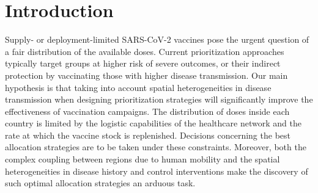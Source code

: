 

\section{Introduction}
Supply- or deployment-limited SARS-CoV-2 vaccines\cite{Khamsi:IfCoronavirusVaccine:2020} pose the urgent question of a fair distribution of the available doses\cite{NationalAcademiesofSciencesEngineeringandMedicine:FrameworkEquitableAllocation:2020}. Current prioritization approaches typically target groups at higher risk of severe outcomes\cite{Spassiani:VaccinationCriteriaBased:2020, Matrajt:VaccineOptimizationCOVID19:2020a}, or their indirect protection by vaccinating those with higher disease transmission\cite{Spassiani:VaccinationCriteriaBased:2020,Gallagher:IndirectBenefitsAre:2021,Tuite:AlternativeDoseAllocation:2021}. Our main hypothesis is that taking into account spatial heterogeneities in disease transmission when designing prioritization strategies will significantly improve the effectiveness of vaccination campaigns.
The distribution of doses inside each country is limited by the logistic capabilities of the healthcare network and the rate at which the vaccine stock is replenished. Decisions concerning the best allocation strategies are to be taken under these constraints. Moreover, both the complex coupling between regions due to human mobility and the spatial heterogeneities in disease history and control interventions make the discovery of such optimal allocation strategies an arduous task.

